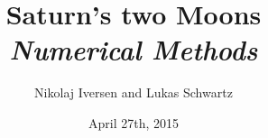 \documentclass[12pt,a4paper]{article}
\begin{document}
\title{Saturn's two Moons\\{\large\emph{Numerical Methods}}}
\author{Nikolaj Iversen and Lukas Schwartz}
\date{April 27th, 2015}
\maketitle


\newpage










\end{document}
